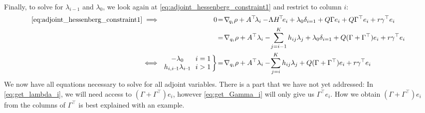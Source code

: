 \documentclass[a4paper,12pt]{article}
\theoremstyle{definition}
\begin{document}
\\
Finally, to solve for $\lambda_{i-1}$ and $\lambda_0$, we look again at \eqref{eq:adjoint_hessenberg_constraint1} and restrict to column $i$:
\begin{align}
    \eqref{eq:adjoint_hessenberg_constraint1} \implies & \empty & \!\!0 &\!= \!\nabla_{\!q_i} \rho + A^\top \!\lambda_i - \!\Lambda H^{\!\top}\!e_i + \lambda_0 \delta_{i=1} 
    + Q\Gamma e_i + Q\Gamma^\top e_i + r \gamma^\top e_i \nonumber
    \\
    &\empty &\empty &\!= \!\nabla_{q_i} \rho + A^\top \lambda_i - \!\sum_{j=i-1}^{K} h_{ij} \lambda_j + \lambda_0 \delta_{i=1} + Q(\Gamma + \Gamma^\top)e_i + r \gamma^\top e_i \nonumber
    \\
    \iff&  & \!\!\!\!\!\begin{array}{cc}
        - \lambda_0 & \!\!i = 1 \\
      h_{i, i\!-\!1} \lambda_{i\!-\!1} & \!\!i > 1
   \end{array}\!\!\bigg\} &\!= \!\nabla_{q_i} \rho + A^\top \lambda_i - \!\sum_{j=i}^{K} h_{ij} \lambda_j + Q(\Gamma + \Gamma^\top)e_i + r \gamma^\top e_i \label{eq:get_lambda_i}
\end{align}
We now have all equations necessary to solve for all adjoint variables. There is a part that we have not yet addressed: In \eqref{eq:get_lambda_i}, we will need access to $(\Gamma + \Gamma^\top)e_i$, however \eqref{eq:get_Gamma_i} will only give us $\Gamma^\top e_i$. How we obtain $(\Gamma + \Gamma^\top)e_i$ from the columns of $\Gamma^\top$ is best explained with an example.
\end{document}
